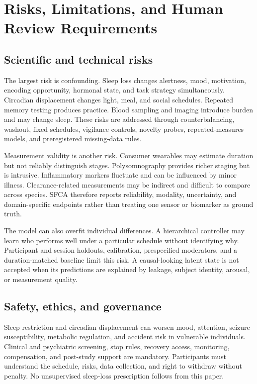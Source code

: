 \documentclass[conference]{IEEEtran}
\begin{document}
\section{Risks, Limitations, and Human Review Requirements}
\subsection{Scientific and technical risks}
The largest risk is confounding. Sleep loss changes alertness, mood, motivation, encoding opportunity, hormonal state, and task strategy simultaneously. Circadian displacement changes light, meal, and social schedules. Repeated memory testing produces practice. Blood sampling and imaging introduce burden and may change sleep. These risks are addressed through counterbalancing, washout, fixed schedules, vigilance controls, novelty probes, repeated-measures models, and preregistered missing-data rules.

Measurement validity is another risk. Consumer wearables may estimate duration but not reliably distinguish stages. Polysomnography provides richer staging but is intrusive. Inflammatory markers fluctuate and can be influenced by minor illness. Clearance-related measurements may be indirect and difficult to compare across species. SFCA therefore reports reliability, modality, uncertainty, and domain-specific endpoints rather than treating one sensor or biomarker as ground truth.

The model can also overfit individual differences. A hierarchical controller may learn who performs well under a particular schedule without identifying why. Participant and session holdouts, calibration, prespecified moderators, and a duration-matched baseline limit this risk. A causal-looking latent state is not accepted when its predictions are explained by leakage, subject identity, arousal, or measurement quality.

\subsection{Safety, ethics, and governance}
Sleep restriction and circadian displacement can worsen mood, attention, seizure susceptibility, metabolic regulation, and accident risk in vulnerable individuals. Clinical and psychiatric screening, stop rules, recovery access, monitoring, compensation, and post-study support are mandatory. Participants must understand the schedule, risks, data collection, and right to withdraw without penalty. No unsupervised sleep-loss prescription follows from this paper.
\end{document}
